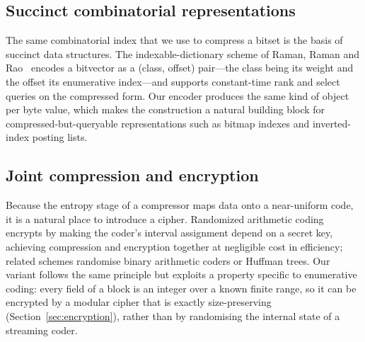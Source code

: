 \documentclass[entropy,article,submit,oneauthor,pdftex]{Definitions/mdpi}
\begin{document}
\subsection{Succinct combinatorial representations}
The same combinatorial index that we use to compress a bitset is the basis of
succinct data structures. The indexable-dictionary scheme of Raman, Raman and
Rao~\cite{raman2002succinct} encodes a bitvector as a (class, offset) pair---the
class being its weight and the offset its enumerative index---and supports
constant-time rank and select queries on the compressed form. Our encoder
produces the same kind of object per byte value, which makes the construction a
natural building block for compressed-but-queryable representations such as
bitmap indexes and inverted-index posting lists.

\subsection{Joint compression and encryption}
Because the entropy stage of a compressor maps data onto a near-uniform code, it
is a natural place to introduce a cipher. Randomized arithmetic
coding~\cite{grangetto2006rac} encrypts by making the coder's interval
assignment depend on a secret key, achieving compression and encryption together
at negligible cost in efficiency; related schemes randomise binary arithmetic
coders or Huffman trees. Our variant follows the same principle but exploits a
property specific to enumerative coding: every field of a block is an integer
over a known finite range, so it can be encrypted by a modular cipher that is
exactly size-preserving (Section~\ref{sec:encryption}), rather than by
randomising the internal state of a streaming coder.
\end{document}
